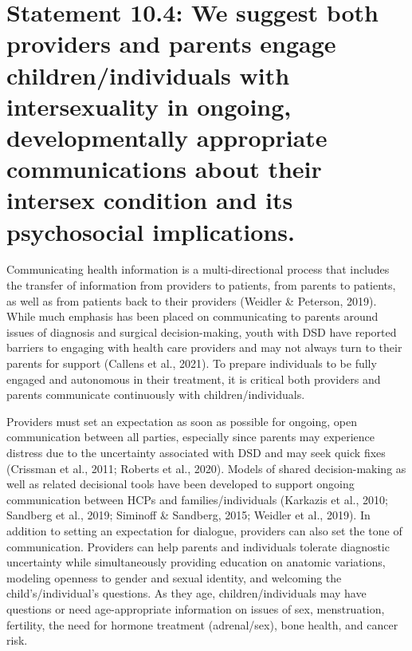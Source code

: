 \documentclass[
]{book}
\begin{document}
\hypertarget{statement-10.4-we-suggest-both-providers-and-parents-engage-childrenindividuals-with-intersexuality-in-ongoing-developmentally-appropriate-communications-about-their-intersex-condition-and-its-psychosocial-implications.}{%
\section*{Statement 10.4: We suggest both providers and parents engage children/individuals with intersexuality in ongoing, developmentally appropriate communications about their intersex condition and its psychosocial implications.}\label{statement-10.4-we-suggest-both-providers-and-parents-engage-childrenindividuals-with-intersexuality-in-ongoing-developmentally-appropriate-communications-about-their-intersex-condition-and-its-psychosocial-implications.}}

Communicating health information is a
multi-directional process that includes the transfer of information from providers to patients,
from parents to patients, as well as from patients
back to their providers (Weidler \& Peterson,
2019). While much emphasis has been placed on
communicating to parents around issues of diagnosis and surgical decision-making, youth with
DSD have reported barriers to engaging with
health care providers and may not always turn
to their parents for support (Callens et al., 2021).
To prepare individuals to be fully engaged and
autonomous in their treatment, it is critical both
providers and parents communicate continuously
with children/individuals.

Providers must set an expectation as soon as
possible for ongoing, open communication
between all parties, especially since parents may
experience distress due to the uncertainty associated with DSD and may seek quick fixes
(Crissman et al., 2011; Roberts et al., 2020).
Models of shared decision-making as well as
related decisional tools have been developed to
support ongoing communication between HCPs
and families/individuals (Karkazis et al., 2010;
Sandberg et al., 2019; Siminoff \& Sandberg, 2015;
Weidler et al., 2019). In addition to setting an
expectation for dialogue, providers can also set
the tone of communication. Providers can help
parents and individuals tolerate diagnostic uncertainty while simultaneously providing education
on anatomic variations, modeling openness to
gender and sexual identity, and welcoming the
child's/individual's questions. As they age, children/individuals may have questions or need
age-appropriate information on issues of sex,
menstruation, fertility, the need for hormone
treatment (adrenal/sex), bone health, and cancer risk.
\end{document}

